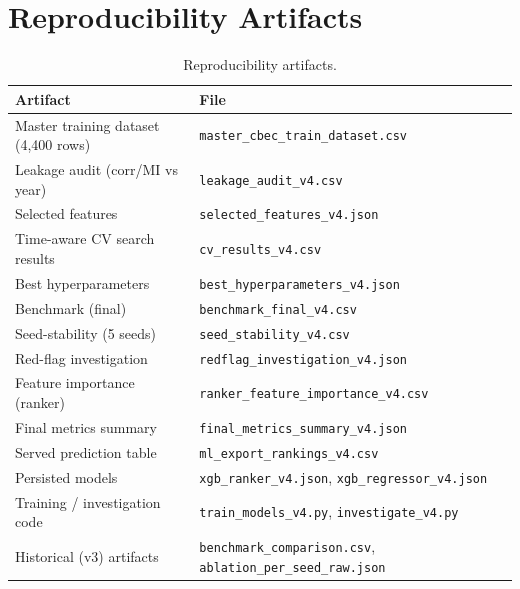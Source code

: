 \documentclass[conference]{IEEEtran}
\begin{document}
\appendices
\section{Reproducibility Artifacts}
\begin{table}[h]
\centering
\caption{Reproducibility artifacts.}
\label{tab:artifacts}
\footnotesize
\begin{tabular}{@{}>{\raggedright\arraybackslash}p{2.9cm}>{\raggedright\arraybackslash}p{5.3cm}@{}}
\toprule
\textbf{Artifact} & \textbf{File} \\
\midrule
Master training dataset (4{,}400 rows) & \texttt{master\_cbec\_train\_dataset.csv} \\
Leakage audit (corr/MI vs year)        & \texttt{leakage\_audit\_v4.csv} \\
Selected features                      & \texttt{selected\_features\_v4.json} \\
Time-aware CV search results           & \texttt{cv\_results\_v4.csv} \\
Best hyperparameters                   & \texttt{best\_hyperparameters\_v4.json} \\
Benchmark (final)                      & \texttt{benchmark\_final\_v4.csv} \\
Seed-stability (5 seeds)               & \texttt{seed\_stability\_v4.csv} \\
Red-flag investigation                 & \texttt{redflag\_investigation\_v4.json} \\
Feature importance (ranker)            & \texttt{ranker\_feature\_importance\_v4.csv} \\
Final metrics summary                  & \texttt{final\_metrics\_summary\_v4.json} \\
Served prediction table                & \texttt{ml\_export\_rankings\_v4.csv} \\
Persisted models                       & \texttt{xgb\_ranker\_v4.json},
                                         \texttt{xgb\_regressor\_v4.json} \\
Training / investigation code          & \texttt{train\_models\_v4.py},
                                         \texttt{investigate\_v4.py} \\
Historical (v3) artifacts              & \texttt{benchmark\_comparison.csv},
                                         \texttt{ablation\_per\_seed\_raw.json} \\
\bottomrule
\end{tabular}
\end{table}
\end{document}
